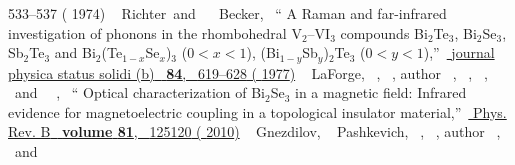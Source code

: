 \documentclass[reprint,aps,pra,superscriptaddress,amsmath,amssymb,linenumbers,longbibliography]{revtex4-1}
\begin{document}
\begin{thebibliography}{79}
{	{533--537} ( {1974})}%
%
\BibitemOpen
{} { {~\bibnamefont
		{Richter}}\ and\  {\ \bibnamefont
		{Becker}},\ } {\enquote { {{A Raman and
				far-infrared investigation of phonons in the rhombohedral V$_2$–VI$_3$
				compounds Bi$_2$Te$_3$, Bi$_2$Se$_3$, Sb$_2$Te$_3$ and
				Bi$_2$(Te$_{1-x}$Se$_x$)$_3$ ($0 < x < 1$), (Bi$_{1-y}$Sb$_y$)$_2$Te$_3$ ($0
				< y < 1$)}},}\ }\href {\doibase 10.1002/pssb.2220840226} {\bibfield
	{journal} { {physica status solidi (b)}\ }\textbf
	{ {84}},\  {619--628} (
	{1977})}%
%
\BibitemOpen
{} { {\ \bibnamefont
		{LaForge}},  {~},
	 {\ }, \bibinfo
	{author} {\ }, 
	{\ }, 
	{\ }, \ and\ 
	{\ },\ } {\enquote
	{ {Optical characterization of {Bi}$_2${Se}$_3$ in a magnetic
			field: Infrared evidence for magnetoelectric coupling in a topological
			insulator material},}\ }\href {\doibase 10.1103/PhysRevB.81.125120}
{ { {Phys. Rev. B}\ }\textbf {\bibinfo
		{volume} {81}},\  {125120} (
	{2010})}%
%
\BibitemOpen
{} { {~\bibnamefont
		{Gnezdilov}},  {\ \bibnamefont
		{Pashkevich}},  {~},
	 {~}, \bibinfo
	{author} {~}, \ and\ 
}
\end{thebibliography}
\end{document}
